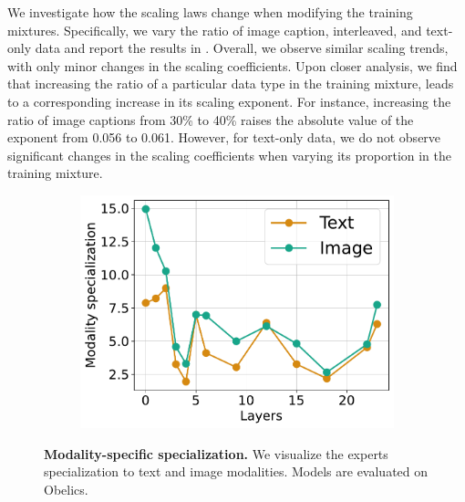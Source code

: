 We investigate how the scaling laws change when modifying the training mixtures. Specifically, we vary the ratio of image caption, interleaved, and text-only data and report the results in . Overall, we observe similar scaling trends, with only minor changes in the scaling coefficients. Upon closer analysis, we find that increasing the ratio of a particular data type in the training mixture, leads to a corresponding increase in its scaling exponent. For instance, increasing the ratio of image captions from 30\% to 40\% raises the absolute value of the exponent from 0.056 to 0.061. However, for text-only data, we do not observe significant changes in the scaling coefficients when varying its proportion in the training mixture.















    
                                 
                                     
                            




                    
                        
                    
                    



\begin{figure}
        \vspace{-4mm}
        \centering
        \captionsetup{type=figure}
        \begin{subfigure}[t]{\linewidth}
            \includegraphics[width=1.0\textwidth]{assets/moes/specialization/model1088/modality_specialization_1088_150_across_layers.pdf}
        \end{subfigure}
        
        \caption{\textbf{Modality-specific specialization.} We visualize the experts specialization to text and image modalities. Models are evaluated on Obelics.}
        \label{fig:app_moes_specialization}
\end{figure}   



